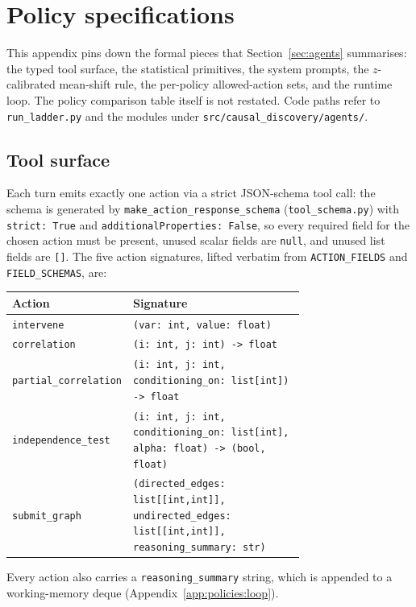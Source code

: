 \section{Policy specifications}
\label{app:policies}

This appendix pins down the formal pieces that Section~\ref{sec:agents} summarises: the typed tool surface, the statistical primitives, the system prompts, the $z$-calibrated mean-shift rule, the per-policy allowed-action sets, and the runtime loop. The policy comparison table itself is not restated. Code paths refer to \texttt{run\_ladder.py} and the modules under \texttt{src/causal\_discovery/agents/}.

\subsection{Tool surface}
\label{app:policies:tools}

Each turn emits exactly one action via a strict JSON-schema tool call: the schema is generated by \texttt{make\_action\_response\_schema} (\texttt{tool\_schema.py}) with \texttt{strict: True} and \texttt{additionalProperties: False}, so every required field for the chosen action must be present, unused scalar fields are \texttt{null}, and unused list fields are \texttt{[]}. The five action signatures, lifted verbatim from \texttt{ACTION\_FIELDS} and \texttt{FIELD\_SCHEMAS}, are:

\begin{center}
\small
\begin{tabular}{@{}l p{0.72\linewidth}@{}}
\toprule
Action & Signature \\
\midrule
\texttt{intervene}            & \texttt{(var: int, value: float)} \\
\texttt{correlation}          & \texttt{(i: int, j: int) -> float} \\
\texttt{partial\_correlation} & \texttt{(i: int, j: int, conditioning\_on: list[int]) -> float} \\
\texttt{independence\_test}   & \texttt{(i: int, j: int, conditioning\_on: list[int], alpha: float) -> (bool, float)} \\
\texttt{submit\_graph}        & \texttt{(directed\_edges: list[[int,int]], undirected\_edges: list[[int,int]], reasoning\_summary: str)} \\
\bottomrule
\end{tabular}
\end{center}

Every action also carries a \texttt{reasoning\_summary} string, which is appended to a working-memory deque (Appendix~\ref{app:policies:loop}).

